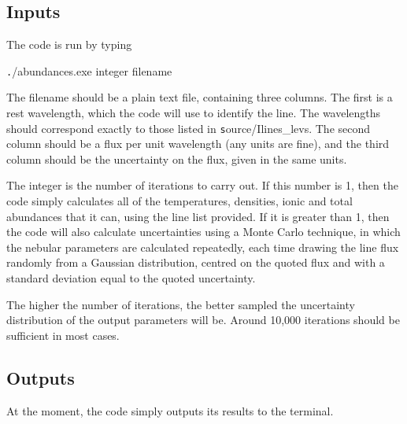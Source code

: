 \documentclass[11pt,a4paper]{article}
\begin{document}
\subsection{Inputs}

The code is run by typing

{\texttt ./abundances.exe integer filename}

The filename should be a plain text file, containing three columns.  The first is a rest wavelength, which the code will use to identify the line.  The wavelengths should correspond exactly to those listed in {\texttt source/Ilines\_levs}.  The second column should be a flux per unit wavelength (any units are fine), and the third column should be the uncertainty on the flux, given in the same units.

The integer is the number of iterations to carry out.  If this number is 1, then the code simply calculates all of the temperatures, densities, ionic and total abundances that it can, using the line list provided.  If it is greater than 1, then the code will also calculate uncertainties using a Monte Carlo technique, in which the nebular parameters are calculated repeatedly, each time drawing the line flux randomly from a Gaussian distribution, centred on the quoted flux and with a standard deviation equal to the quoted uncertainty.

The higher the number of iterations, the better sampled the uncertainty distribution of the output parameters will be.  Around 10,000 iterations should be sufficient in most cases.

\subsection{Outputs}

At the moment, the code simply outputs its results to the terminal.

%
%
%
%
%
%
\end{document}
